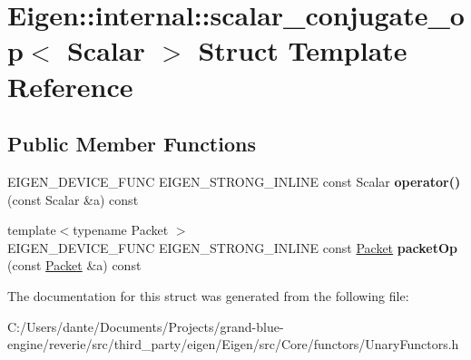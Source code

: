 \hypertarget{struct_eigen_1_1internal_1_1scalar__conjugate__op}{}\section{Eigen\+::internal\+::scalar\+\_\+conjugate\+\_\+op$<$ Scalar $>$ Struct Template Reference}
\label{struct_eigen_1_1internal_1_1scalar__conjugate__op}
\subsection*{Public Member Functions}
\begin{DoxyCompactItemize}
\item 
\mbox{\label{struct_eigen_1_1internal_1_1scalar__conjugate__op_a90613357940087806d7b629e7258b45f}} 
E\+I\+G\+E\+N\+\_\+\+D\+E\+V\+I\+C\+E\+\_\+\+F\+U\+NC E\+I\+G\+E\+N\+\_\+\+S\+T\+R\+O\+N\+G\+\_\+\+I\+N\+L\+I\+NE const Scalar {\bfseries operator()} (const Scalar \&a) const
\item 
\mbox{\label{struct_eigen_1_1internal_1_1scalar__conjugate__op_a298f1da62e5ad65656c8dcc13ebaadfa}} 
{\footnotesize template$<$typename Packet $>$ }\\E\+I\+G\+E\+N\+\_\+\+D\+E\+V\+I\+C\+E\+\_\+\+F\+U\+NC E\+I\+G\+E\+N\+\_\+\+S\+T\+R\+O\+N\+G\+\_\+\+I\+N\+L\+I\+NE const \mbox{\hyperlink{union_eigen_1_1internal_1_1_packet}{Packet}} {\bfseries packet\+Op} (const \mbox{\hyperlink{union_eigen_1_1internal_1_1_packet}{Packet}} \&a) const
\end{DoxyCompactItemize}


The documentation for this struct was generated from the following file\+:\begin{DoxyCompactItemize}
\item 
C\+:/\+Users/dante/\+Documents/\+Projects/grand-\/blue-\/engine/reverie/src/third\+\_\+party/eigen/\+Eigen/src/\+Core/functors/Unary\+Functors.\+h\end{DoxyCompactItemize}
